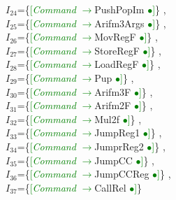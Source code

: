 \documentclass[a0]{a0poster}
\begin{document}
$I_{24}$=\{\textcolor{Green}{[}\textcolor{Green}{\textit{Command}} \textcolor{Green}{$\to$}PushPopIm \textcolor{Green}{$\bullet$}\textcolor{Green}{]}\}
,\\
$I_{25}$=\{\textcolor{Green}{[}\textcolor{Green}{\textit{Command}} \textcolor{Green}{$\to$}Arifm3Args \textcolor{Green}{$\bullet$}\textcolor{Green}{]}\}
,\\
$I_{26}$=\{\textcolor{Green}{[}\textcolor{Green}{\textit{Command}} \textcolor{Green}{$\to$}MovRegF \textcolor{Green}{$\bullet$}\textcolor{Green}{]}\}
,\\
$I_{27}$=\{\textcolor{Green}{[}\textcolor{Green}{\textit{Command}} \textcolor{Green}{$\to$}StoreRegF \textcolor{Green}{$\bullet$}\textcolor{Green}{]}\}
,\\
$I_{28}$=\{\textcolor{Green}{[}\textcolor{Green}{\textit{Command}} \textcolor{Green}{$\to$}LoadRegF \textcolor{Green}{$\bullet$}\textcolor{Green}{]}\}
,\\
$I_{29}$=\{\textcolor{Green}{[}\textcolor{Green}{\textit{Command}} \textcolor{Green}{$\to$}Pup \textcolor{Green}{$\bullet$}\textcolor{Green}{]}\}
,\\
$I_{30}$=\{\textcolor{Green}{[}\textcolor{Green}{\textit{Command}} \textcolor{Green}{$\to$}Arifm3F \textcolor{Green}{$\bullet$}\textcolor{Green}{]}\}
,\\
$I_{31}$=\{\textcolor{Green}{[}\textcolor{Green}{\textit{Command}} \textcolor{Green}{$\to$}Arifm2F \textcolor{Green}{$\bullet$}\textcolor{Green}{]}\}
,\\
$I_{32}$=\{\textcolor{Green}{[}\textcolor{Green}{\textit{Command}} \textcolor{Green}{$\to$}Mul2f \textcolor{Green}{$\bullet$}\textcolor{Green}{]}\}
,\\
$I_{33}$=\{\textcolor{Green}{[}\textcolor{Green}{\textit{Command}} \textcolor{Green}{$\to$}JumpReg1 \textcolor{Green}{$\bullet$}\textcolor{Green}{]}\}
,\\
$I_{34}$=\{\textcolor{Green}{[}\textcolor{Green}{\textit{Command}} \textcolor{Green}{$\to$}JumprReg2 \textcolor{Green}{$\bullet$}\textcolor{Green}{]}\}
,\\
$I_{35}$=\{\textcolor{Green}{[}\textcolor{Green}{\textit{Command}} \textcolor{Green}{$\to$}JumpCC \textcolor{Green}{$\bullet$}\textcolor{Green}{]}\}
,\\
$I_{36}$=\{\textcolor{Green}{[}\textcolor{Green}{\textit{Command}} \textcolor{Green}{$\to$}JumpCCReg \textcolor{Green}{$\bullet$}\textcolor{Green}{]}\}
,\\
$I_{37}$=\{\textcolor{Green}{[}\textcolor{Green}{\textit{Command}} \textcolor{Green}{$\to$}CallRel \textcolor{Green}{$\bullet$}\textcolor{Green}{]}\}
\end{document}
